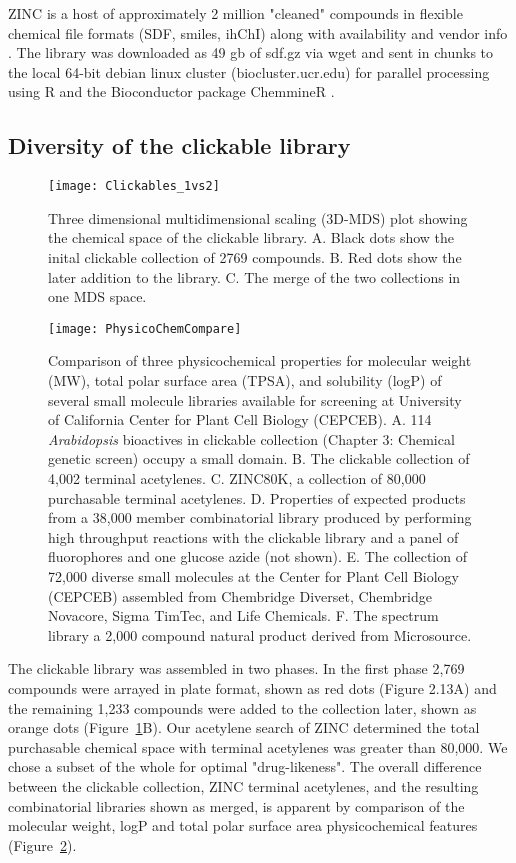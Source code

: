 ZINC is a host of approximately 2 million "cleaned" compounds in flexible chemical file formats (SDF, smiles, ihChI) along with availability and vendor info \cite{irwin2005zinc}. The library was downloaded as 49 gb of sdf.gz via wget and sent in chunks to the local 64-bit debian linux cluster (biocluster.ucr.edu) for parallel processing using R and the Bioconductor package ChemmineR \cite{cao2008chemminer}.

\subsection {Diversity of the clickable library}

\begin{figure}
\centering
\texttt{[image: Clickables\_1vs2]}
\caption{Three dimensional multidimensional scaling (3D-MDS) plot showing the chemical space of the clickable library. A. Black dots show the inital clickable collection of 2769 compounds. B. Red dots show the later addition to the library. C. The merge of the two collections in one MDS space.}
\label{fig:Clickables1vs2}
\end{figure}

\begin{figure}
\texttt{[image: PhysicoChemCompare]}
\caption{Comparison of three physicochemical properties for molecular weight (MW), total polar surface area (TPSA), and solubility (logP) of several small molecule libraries available for screening at University of California Center for Plant Cell Biology (CEPCEB). A. 114 {\it Arabidopsis} bioactives in clickable collection (Chapter 3: Chemical genetic screen) occupy a small domain. B. The clickable collection of 4,002 terminal acetylenes. C. ZINC80K, a collection of 80,000 purchasable terminal acetylenes. D. Properties of expected products from a 38,000 member combinatorial library produced by performing high throughput reactions with the clickable library and a panel of fluorophores and one glucose azide (not shown). E. The collection of 72,000 diverse small molecules at the Center for Plant Cell Biology (CEPCEB) assembled from Chembridge Diverset, Chembridge Novacore, Sigma TimTec, and Life Chemicals. F. The spectrum library a 2,000 compound natural product derived from Microsource.}
\label{fig:PhysicochemicalCompare}
\end{figure}

The clickable library was assembled in two phases. In the first phase 2,769  compounds were arrayed in plate format, shown as red dots (Figure 2.13A) and the remaining 1,233 compounds were added to the collection later, shown as orange dots (Figure~\ref{fig:Clickables1vs2}B). Our acetylene search of ZINC determined the total purchasable chemical space with terminal acetylenes was greater than 80,000. We chose a subset of the whole for optimal "drug-likeness". The overall difference between the clickable collection, ZINC terminal acetylenes, and the resulting combinatorial libraries shown as merged, is apparent by comparison of the molecular weight, logP and total polar surface area physicochemical features (Figure~\ref{fig:PhysicochemicalCompare}).

